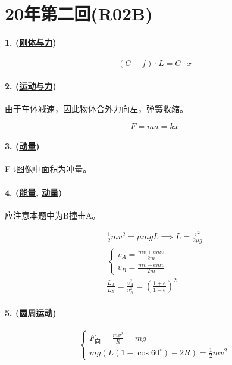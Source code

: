
\section{20年第二回(R02B)}

\paragraph{1. (\hyperref[subsec:刚体与力]{刚体与力})}

\begin{equation*}
    (G-f)\cdot L=G\cdot x
\end{equation*}

\paragraph{2. (\hyperref[subsec:运动与力]{运动与力})} 由于车体减速，因此物体合外力向左，弹簧收缩。

\begin{equation*}
    F=ma=kx
\end{equation*}

\paragraph{3. (\hyperref[subsec:动量]{动量})} F-t图像中面积为冲量。
\paragraph{4. (\hyperref[subsec:能量]{能量}, \hyperref[subsec:动量]{动量})} 应注意本题中为B撞击A。

\begin{gather*}
    \frac12mv^2=\mu mgL\implies L=\frac{v^2}{2\mu g}\\
    \begin{cases}
        v_A=\frac{mv+emv}{2m}\\
        v_B=\frac{mv-emv}{2m}
    \end{cases}\\
    \frac{L_A}{L_B}=\frac{v_A^2}{v_B^2}=\left(\frac{1+e}{1-e}\right)^2
\end{gather*}

\paragraph{5. (\hyperref[subsec:圆周运动]{圆周运动})}

\begin{equation*}
    \begin{cases}
        F_\textrm{向}=\frac{mv^2}{R}=mg\\
        mg(L(1-\cos60^\circ)-2R)=\frac12mv^2
    \end{cases}
\end{equation*}

